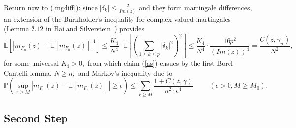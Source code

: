 \documentclass{article}
\numberwithin{equation}{section}
\begin{document}
\par
Return now to (\ref{mgdiff}): since \(|\delta_k| \leq \frac{2}{Im(z)}\) and they form martingale differences, an extension of the Burkholder's inequality for complex-valued martingales (Lemma \(2.12\) in Bai and Silverstein~\cite{baisilvbook}) provides
\begin{equation}\label{bd4th}
    \mathbb{E}[|m_{F_n}(z)-\mathbb{E}[m_{F_n}(z)]|^4] \leq \frac{K_4}{N^4} \cdot \mathbb{E}[(\sum_{1 \leq k \leq p}{|\delta_k|^2})^2] \leq \frac{K_4}{N^4} \cdot \frac{16p^2}{(Im(z))^4}=\frac{C(z,\gamma_n)}{N^2},
\end{equation}
for some universal \(K_4>0,\) from which claim (\ref{as}) ensues by the first Borel-Cantelli lemma, \(N \geq n,\) and Markov's inequality due to%
\[\mathbb{P}(\sup_{r \geq M}{|m_{F_r}(z)-\mathbb{E}[m_{F_r}(z)]| \geq \epsilon}) \leq \sum_{r \geq M}{\frac{1+C(z,\gamma)}{n^2 \cdot \epsilon^4}} \hspace{1cm} (\epsilon>0, M \geq M_0).\]


\subsection*{Second Step}
\end{document}
